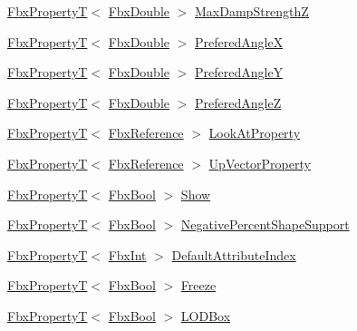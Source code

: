 \begin{Indent}
\begin{DoxyCompactItemize}
\hyperlink{class_fbx_property_t}{Fbx\+PropertyT}$<$ \hyperlink{fbxtypes_8h_a171e72a1c46fc15c1a6c9c31948c1c5b}{Fbx\+Double} $>$ \hyperlink{class_fbx_node_a560c4e2acb691a960b607f9381b26681}{Max\+Damp\+StrengthZ}
\item 
\hyperlink{class_fbx_property_t}{Fbx\+PropertyT}$<$ \hyperlink{fbxtypes_8h_a171e72a1c46fc15c1a6c9c31948c1c5b}{Fbx\+Double} $>$ \hyperlink{class_fbx_node_a1d8741e42e815896c90d9305d34419f9}{Prefered\+AngleX}
\item 
\hyperlink{class_fbx_property_t}{Fbx\+PropertyT}$<$ \hyperlink{fbxtypes_8h_a171e72a1c46fc15c1a6c9c31948c1c5b}{Fbx\+Double} $>$ \hyperlink{class_fbx_node_ac5f0da599ec317865ff798392aa3d6a6}{Prefered\+AngleY}
\item 
\hyperlink{class_fbx_property_t}{Fbx\+PropertyT}$<$ \hyperlink{fbxtypes_8h_a171e72a1c46fc15c1a6c9c31948c1c5b}{Fbx\+Double} $>$ \hyperlink{class_fbx_node_ac046dda87f5e05652e7319a52e89d9f9}{Prefered\+AngleZ}
\item 
\hyperlink{class_fbx_property_t}{Fbx\+PropertyT}$<$ \hyperlink{fbxtypes_8h_a44df6a2eec915cf27cd481e5c5e48a24}{Fbx\+Reference} $>$ \hyperlink{class_fbx_node_a58a10b7beeedd498ccec72c33fa66079}{Look\+At\+Property}
\item 
\hyperlink{class_fbx_property_t}{Fbx\+PropertyT}$<$ \hyperlink{fbxtypes_8h_a44df6a2eec915cf27cd481e5c5e48a24}{Fbx\+Reference} $>$ \hyperlink{class_fbx_node_a657f66c69f9ac6811487c95f01d0c345}{Up\+Vector\+Property}
\item 
\hyperlink{class_fbx_property_t}{Fbx\+PropertyT}$<$ \hyperlink{fbxtypes_8h_a92e0562b2fe33e76a242f498b362262e}{Fbx\+Bool} $>$ \hyperlink{class_fbx_node_a685ccf0b6e1bc5070c28d9e7a8823c74}{Show}
\item 
\hyperlink{class_fbx_property_t}{Fbx\+PropertyT}$<$ \hyperlink{fbxtypes_8h_a92e0562b2fe33e76a242f498b362262e}{Fbx\+Bool} $>$ \hyperlink{class_fbx_node_afa440edf621ff6e21b1c1abd626ac82a}{Negative\+Percent\+Shape\+Support}
\item 
\hyperlink{class_fbx_property_t}{Fbx\+PropertyT}$<$ \hyperlink{fbxtypes_8h_a088fa96de3b0b3ea69f0f6afef525dfb}{Fbx\+Int} $>$ \hyperlink{class_fbx_node_aeef58595094078471017626db0fb1f00}{Default\+Attribute\+Index}
\item 
\hyperlink{class_fbx_property_t}{Fbx\+PropertyT}$<$ \hyperlink{fbxtypes_8h_a92e0562b2fe33e76a242f498b362262e}{Fbx\+Bool} $>$ \hyperlink{class_fbx_node_a473f1f463eefd348b159ff832d6681a1}{Freeze}
\item 
\hyperlink{class_fbx_property_t}{Fbx\+PropertyT}$<$ \hyperlink{fbxtypes_8h_a92e0562b2fe33e76a242f498b362262e}{Fbx\+Bool} $>$ \hyperlink{class_fbx_node_a7f622a4a695494b60221268ec33f54cb}{L\+O\+D\+Box}
\end{DoxyCompactItemize}
\end{Indent}
